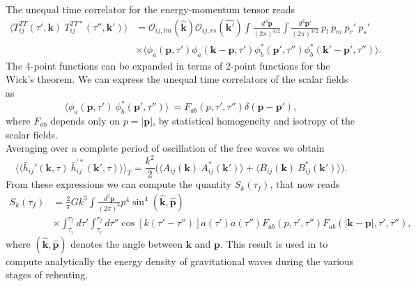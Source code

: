 \documentclass[11pt,a4paper,twoside]{book}
\begin{document}
 The unequal time correlator for the energy-momentum tensor reads
 \begin{equation} 	
 \begin{split}
 		\label{Chap7:UnequalTimeCorrelators}
  \langle T^{TT}_{ij}(\tau',\textbf{k})\ T^{TT*}_{ij}(\tau'',\textbf{k}')\rangle 
&= \mathcal{O}_{ij,lm}(\hat{\textbf{k}})\mathcal{O}_{ij,rs}(\hat{\textbf{k}'})
\int \frac{d^{3} \textbf{p}}{(2\pi)^{3/2}} \int \frac{d^{3} \textbf{p}'}{(2\pi)^{3/2}}\ p_{l}\ p_{m}\ p_{r}'\ p_{s}' \\
&  \times \langle \phi_{a}(\textbf{p},\tau')\phi_{a}(\textbf{k}-\textbf{p},\tau')\phi_{b}^{*}(\textbf{p}',\tau'')\phi_{b}^{*}(\textbf{k}'-\textbf{p}',\tau'')\rangle .
\end{split} 	 
 \end{equation}
The 4-point functions can be expanded in terms of 2-point functions for the Wick's theorem. We can express the unequal time correlators of the scalar fields  as 
\begin{equation}
\label{Chap7:correlatorsPhi}
\langle \phi_{a}(\textbf{p},\tau')\ \phi_{b}^{*}(\textbf{p}',\tau'')\rangle  \ =F_{ab}(p,\tau',\tau'')\delta(\textbf{p}-\textbf{p}'),
\end{equation}
where $ F_{ab} $ depends only on $ p=|\textbf{p}| $, by statistical homogeneity and isotropy of the scalar fields.\\
Averaging over a complete period of oscillation of the free waves we obtain
\begin{equation}
\label{Chap7:average}
\langle \langle \bar{h}_{ij}'(\textbf{k},\tau)\ \bar{h}^{'*}_{ij}(\textbf{k}',\tau)\rangle \rangle _{T}=\frac{k^{2}}{2}\Big(\langle A_{ij}(\textbf{k})\ A^{*}_{ij}(\textbf{k}')\rangle  + \langle B_{ij}(\textbf{k})\ B^{*}_{ij}(\textbf{k}')\rangle \Big).
\end{equation}
From these expressions we can compute the quantity $ S_{k}(\tau_{f}) $, that now reads
\begin{equation}
\label{Chap7:quantitySk}
\begin{split}
S_{k}(\tau_{f}) & =\frac{2}{\pi}Gk^{3}\int \frac{d^{3} \textbf{p}}{(2\pi)^{3}}p^{4}\sin^{4}(\hat{\textbf{k}},\hat{\textbf{p}}) \\
               & \times \int_{\tau_{i}}^{\tau_{f}} d\tau' \int_{\tau_{i}}^{\tau_{f}} d\tau'' \cos [k(\tau'-\tau'')] a(\tau')a(\tau'')F_{ab}(p,\tau ',\tau'') F_{ab}(|\textbf{k}-\textbf{p}|,\tau',\tau''),  
\end{split}
\end{equation}
where $ (\hat{\textbf{k}},\hat{\textbf{p}}) $ denotes the angle between $ \textbf{k} $ and $ \textbf{p} $. This result is used in \cite{Chap7:GreenMethod} to compute analytically the energy density of gravitational waves during the various stages of reheating.
\end{document}
